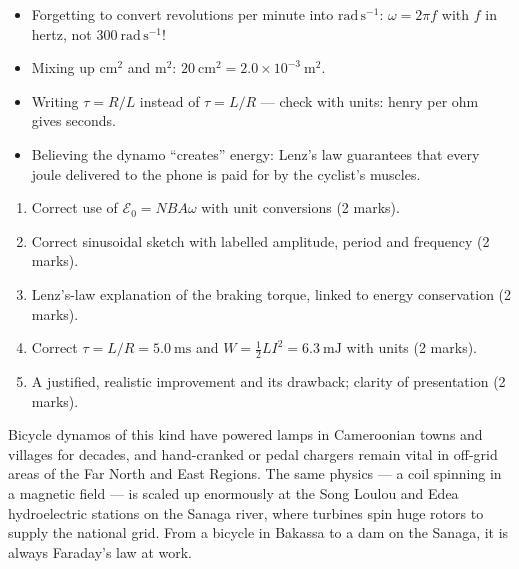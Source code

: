 \documentclass[11pt]{article}
\begin{document}
\begin{attention}
\begin{itemize}
\item Forgetting to convert revolutions per minute into $\mathrm{rad\,s^{-1}}$: $\omega = 2\pi f$ with $f$ in hertz, not $300\ \mathrm{rad\,s^{-1}}$!
\item Mixing up $\mathrm{cm^2}$ and $\mathrm{m^2}$: $20\ \mathrm{cm^2} = 2.0\times 10^{-3}\ \mathrm{m^2}$.
\item Writing $\tau = R/L$ instead of $\tau = L/R$ — check with units: henry per ohm gives seconds.
\item Believing the dynamo ``creates'' energy: Lenz's law guarantees that every joule delivered to the phone is paid for by the cyclist's muscles.
\end{itemize}
\end{attention}

\begin{methode}
\begin{enumerate}
\item Correct use of $\mathcal{E}_0 = NBA\omega$ with unit conversions (2 marks).
\item Correct sinusoidal sketch with labelled amplitude, period and frequency (2 marks).
\item Lenz's-law explanation of the braking torque, linked to energy conservation (2 marks).
\item Correct $\tau = L/R = 5.0\ \mathrm{ms}$ and $W = \tfrac12 LI^2 = 6.3\ \mathrm{mJ}$ with units (2 marks).
\item A justified, realistic improvement and its drawback; clarity of presentation (2 marks).
\end{enumerate}
\end{methode}

\begin{savaistu}
Bicycle dynamos of this kind have powered lamps in Cameroonian towns and villages for decades, and hand-cranked or pedal chargers remain vital in off-grid areas of the Far North and East Regions. The same physics — a coil spinning in a magnetic field — is scaled up enormously at the Song Loulou and Edea hydroelectric stations on the Sanaga river, where turbines spin huge rotors to supply the national grid. From a bicycle in Bakassa to a dam on the Sanaga, it is always Faraday's law at work.
\end{savaistu}
\end{document}
